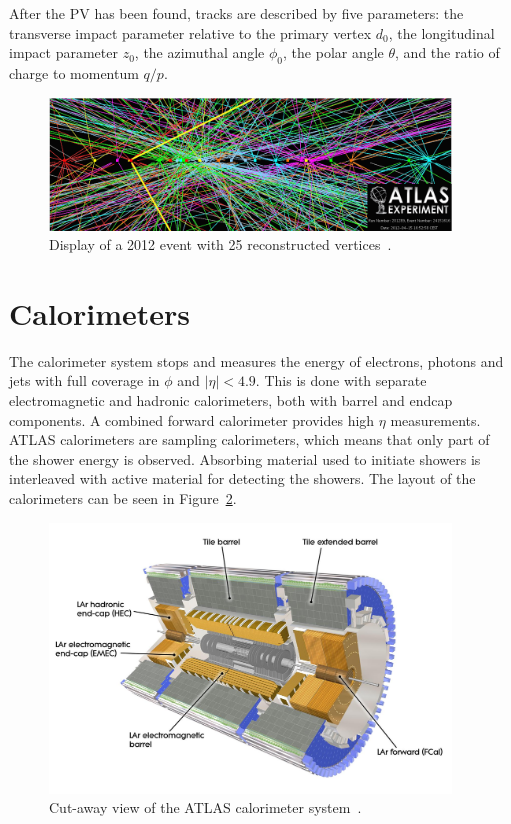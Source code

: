 After the PV has been found, tracks are described by five parameters: the transverse impact parameter relative to the primary vertex $d_0$, the longitudinal impact parameter $z_0$, the azimuthal angle $\phi_0$, the polar angle $\theta$, and the ratio of charge to momentum $q/p$. 

\begin{figure}[tp]
  \centering
  \includegraphics[width=0.95\textwidth]{fig/atlas/pileupEvent}
  \caption{Display of a 2012 event with 25 reconstructed vertices~\cite{eventdisp}.}
  \label{fig:disppileup}
\end{figure}

\section{Calorimeters}
The calorimeter system  stops and measures the energy of electrons, photons and jets with full coverage in $\phi$ and $|\eta|<4.9$. This is done with separate electromagnetic and hadronic calorimeters, both with barrel and endcap components. A combined forward calorimeter provides high $\eta$ measurements. ATLAS calorimeters are sampling calorimeters, which means that only part of the shower energy is observed. Absorbing material used to initiate showers is interleaved with active material for detecting the showers. The layout of the calorimeters can be seen in Figure~\ref{fig:calo}. 

\begin{figure}[tp]
  \centering
  \includegraphics[width=0.95\textwidth]{fig/atlas/combinedCalo}
  \caption{Cut-away view of the ATLAS calorimeter system~\cite{cern-jinst-atlas}.}
  \label{fig:calo}
\end{figure}
